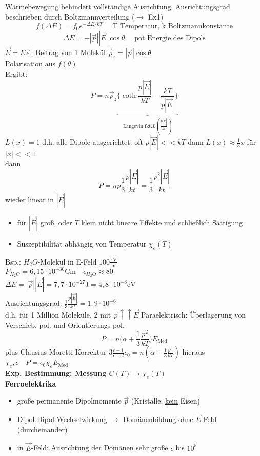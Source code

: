 \documentclass[titlepage,12pt,a4paper,ngerman]{report}
\newcommand{\tx}[1]{\textrm{#1}}
\newcommand{\ub}[1]{\underbrace{#1}}
\begin{document}
Wärmebewegung behindert vollständige Ausrichtung. Ausrichtungsgrad beschrieben durch Boltzmannverteilung ($\rightarrow$ Ex1)
$$f(\Delta E) = f_0 e ^{-\Delta E / kT} \quad \tx{ T Temperatur, k Boltzmannkonstante}$$
$$\Delta E = -|\vec{p}| |\vec{E}| \cos \theta \quad \tx{ pot Energie des Dipols}$$
$\vec{E} = E \vec{e}_z$ Beitrag von 1 Molekül $\vec{p}_z = |\vec{p}| \cos \theta$\\
Polarisation aus $f(\theta)$\\
Ergibt: $$P = n \vec{p}_z \ub{\Big\{\coth \frac{p|\vec{E}|}{kT} - \frac{kT}{p|\vec{E}|} \Big\} }_{ \tx{Langevin fkt.} L(\frac{p|\vec{E}|}{kt})}$$
$L(x) = 1$ d.h. alle Dipole ausgerichtet. oft $p|\vec{E}| << kT $ dann $L(x) \approx \frac{1}{3}x $ für $|x| <<1$ \\
dann $$P= n p \frac{1}{3} \frac{p|\vec{E}|}{kt} = \frac{1}{3} \frac{p^2|\vec{E}|}{kt}$$ wieder linear in $|\vec{E}|$
\begin{itemize}
\item für $|\vec{E}|$ groß, oder $T$ klein nicht lineare Effekte und schließlich Sättigung
\item Suszeptibilität abhängig von Temperatur $\chi_e(T)$
\end{itemize}
Bsp.: $H_2O$-Molekül in E-Feld $100\frac{\tx{kV}}{\tx{m}}$\\
$P_{H_2O} = 6,15 \cdot 10^{-30} \tx{Cm} \quad \epsilon_{H_2O} \approx 80$\\
$\Delta E = |\vec{p}||\vec{E}| = 7,7 \cdot 10^{-27} \tx{J} = 4,8 \cdot 10^{-8} \tx{eV}$\\
Ausrichtungsgrad: $\frac{1}{3} \frac{p|\vec{E}|}{kT} = 1,9 \cdot 10^{-6}$\\
d.h. für 1 Million Moleküle, 2 mit $\vec{p}\uparrow \uparrow \vec{E}$
Paraelektrisch: Überlagerung von Verschieb. pol. und Orientierungs-pol.\\
$$P = n\Big(\alpha + \frac{1}{3} \frac{p^2}{kT}\Big) E_{\tx{Med}}$$
plus Clausius-Moretti-Korrektur $ 3\frac{\epsilon-1}{\epsilon +2} \epsilon_0 = n ( \alpha + \frac{1}{3} \frac{p^3}{kT})$
hieraus $\chi_e, \epsilon \quad P = \epsilon_0 \chi_e E_{\tx{Med}}$\\
\textbf{Exp. Bestimmung: Messung $C(T) \rightarrow \chi_e(T)$}\\
\textbf{Ferroelektrika}
\begin{itemize}
\item große permanente Dipolmomente $\vec{p}$ (Kristalle, \underline{kein} Eisen)
\item Dipol-Dipol-Wechselwirkung $\rightarrow$ Domänenbildung
ohne $\vec{E}$-Feld (durcheinander)
\item in $\vec{E}$-Feld: Ausrichtung der Domänen sehr große $\epsilon$ bis $10^5$
\end{itemize}
\end{document}
